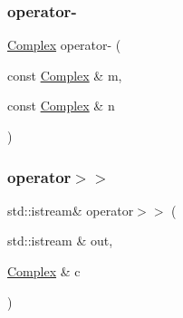 \mbox{\label{classComplex_ab2328f9c33b801e1ab56ee119493440f}} 
\subsubsection{\texorpdfstring{operator-\/}{operator-}}
{\footnotesize\ttfamily \mbox{\hyperlink{classComplex}{Complex}} operator-\/ (\begin{DoxyParamCaption}\item[{const \mbox{\hyperlink{classComplex}{Complex}} \&}]{m,  }\item[{const \mbox{\hyperlink{classComplex}{Complex}} \&}]{n }\end{DoxyParamCaption})\hspace{0.3cm}{\ttfamily [friend]}}

\mbox{\label{classComplex_a4c3792c8f6bd0778d0607c3a161e9eb6}} 
\subsubsection{\texorpdfstring{operator$>$$>$}{operator>>}}
{\footnotesize\ttfamily std\+::istream\& operator$>$$>$ (\begin{DoxyParamCaption}\item[{std\+::istream \&}]{out,  }\item[{\mbox{\hyperlink{classComplex}{Complex}} \&}]{c }\end{DoxyParamCaption})\hspace{0.3cm}{\ttfamily [friend]}}


